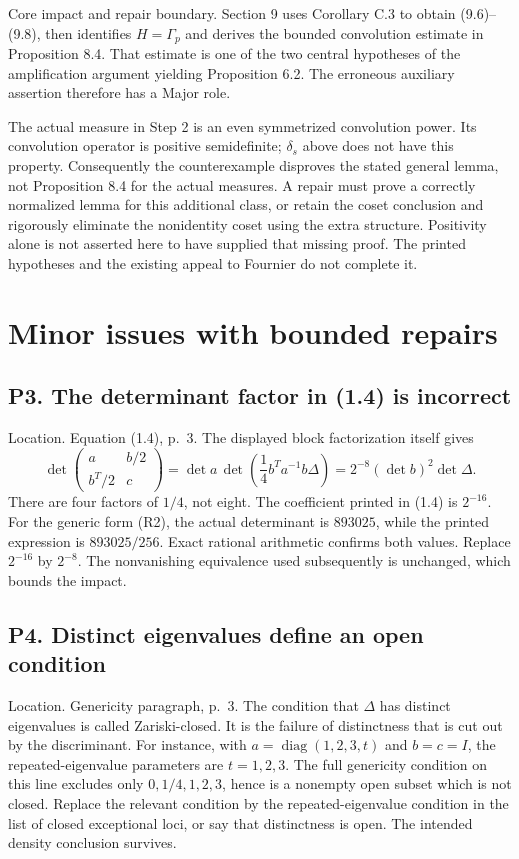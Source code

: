 \documentclass[10pt]{article}
\begin{document}
Core impact and repair boundary. Section 9 uses Corollary C.3 to obtain (9.6)–(9.8), then identifies \(H=\Gamma_p\) and derives the bounded convolution estimate in Proposition 8.4. That estimate is one of the two central hypotheses of the amplification argument yielding Proposition 6.2. The erroneous auxiliary assertion therefore has a Major role.\par
The actual measure in Step 2 is an even symmetrized convolution power. Its convolution operator is positive semidefinite; \(\delta_s\) above does not have this property. Consequently the counterexample disproves the stated general lemma, not Proposition 8.4 for the actual measures. A repair must prove a correctly normalized lemma for this additional class, or retain the coset conclusion and rigorously eliminate the nonidentity coset using the extra structure. Positivity alone is not asserted here to have supplied that missing proof. The printed hypotheses and the existing appeal to Fournier do not complete it.\par
\section*{Minor issues with bounded repairs}
\subsection*{P3. The determinant factor in (1.4) is incorrect}
Location. Equation (1.4), p. 3. The displayed block factorization itself gives \[\det\begin{pmatrix}a&b/2\\b^T/2&c\end{pmatrix}
 =\det a\,
   \det\left(\frac14b^Ta^{-1}b\Delta\right)
 =2^{-8}(\det b)^2\det\Delta.
 \tag{R8}\] There are four factors of \(1/4\), not eight. The coefficient printed in (1.4) is \(2^{-16}\). For the generic form (R2), the actual determinant is \(893025\), while the printed expression is \(893025/256\). Exact rational arithmetic confirms both values. Replace \(2^{-16}\) by \(2^{-8}\). The nonvanishing equivalence used subsequently is unchanged, which bounds the impact.\par
\subsection*{P4. Distinct eigenvalues define an open condition}
Location. Genericity paragraph, p. 3. The condition that \(\Delta\) has distinct eigenvalues is called Zariski-closed. It is the failure of distinctness that is cut out by the discriminant. For instance, with \(a=\operatorname{diag}(1,2,3,t)\) and \(b=c=I\), the repeated-eigenvalue parameters are \(t=1,2,3\). The full genericity condition on this line excludes only \(0,1/4,1,2,3\), hence is a nonempty open subset which is not closed. Replace the relevant condition by the repeated-eigenvalue condition in the list of closed exceptional loci, or say that distinctness is open. The intended density conclusion survives.\par
\end{document}
